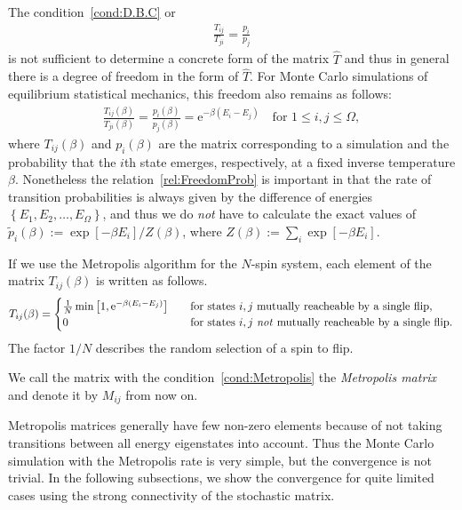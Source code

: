 The condition~\eqref{cond:D.B.C} or
\begin{align}
\frac{T_{ij}}{T_{ji}} = \frac{p_{i}}{p_{j}}
\end{align}
is not sufficient to determine a concrete form of the matrix $\hat{T}$ and thus in general there is a degree of freedom in the form of $\hat{T}$. For Monte Carlo simulations of equilibrium statistical mechanics, this freedom also remains as follows:
\begin{align}
\frac{T_{ij}(\beta)}{T_{ji}(\beta)} = \frac{p_{i}(\beta)}{p_{j}(\beta)} = \mathrm{e}^{-\beta (E_{i}-E_{j})}\quad\text{for $1\leq i,j\leq \Omega$}\label{rel:FreedomProb},
\end{align}
where ${T_{ij}(\beta)}$ and $p_{i}(\beta)$ are the matrix corresponding to a simulation and the probability that the $i$th state emerges, respectively, at a fixed inverse temperature $\beta$. Nonetheless the relation~\eqref{rel:FreedomProb} is important in that the rate of transition probabilities is always given by the difference of energies $\left\{E_{1},E_{2},\dots,E_{\Omega}\right\}$, and thus we do \textit{not} have to calculate the exact values of $\tilde{p}_{i}(\beta):=\exp\left[-\beta E_{i}\right]/Z(\beta)$, where $Z(\beta):=\sum_{i}\exp\left[-\beta E_{i}\right]$.

If we use the Metropolis algorithm for the $N$-spin system, each element of the matrix $T_{ij}(\beta)$ is written as follows.
\begin{align}
T_{ij}(\beta)=
\begin{cases}
\frac{1}{N}\min\left[1,\mathrm{e}^{-\beta (E_{i}-E_{j})}\right]\quad&\text{for states $i,j$ mutually reacheable by a single flip},\\
0\quad&\text{for states $i,j$ \textit{not} mutually reacheable by a single flip}.
\end{cases}\label{cond:Metropolis}
\end{align}
The factor $1/N$ describes the random selection of a spin to flip.

We call the matrix with the condition~\eqref{cond:Metropolis} the \textit{Metropolis matrix} and denote it by $M_{ij}$ from now on. 

Metropolis matrices generally have few non-zero elements because of not taking transitions between all energy eigenstates into account. Thus the Monte Carlo simulation with the Metropolis rate is very simple, but the convergence is not trivial. In the following subsections, we show the convergence for quite limited cases using the strong connectivity of the stochastic matrix.

